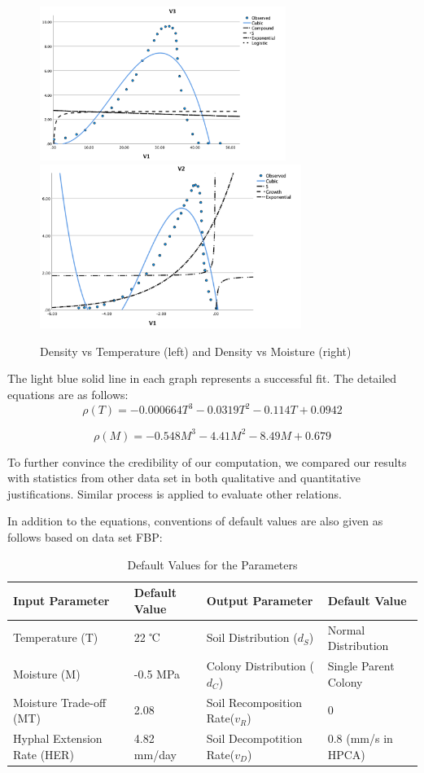 \documentclass[12pt]{article}
\begin{document}
\begin{figure}[!htbp]
	\small
	\centering
	\includegraphics[width=8cm]{./pictures/temp1.png}
	\includegraphics[width=8.5cm]{./pictures/moisture1.png}
	\caption{Density vs Temperature (left) and Density vs Moisture (right)}\label{nt}
\end{figure}
The light blue solid line in each graph represents a successful fit. The detailed equations are as follows:
\begin{equation}
	\rho (T)=-0.000664T^3-0.0319T^2-0.114T+0.0942
\end{equation}

\begin{equation}
	\rho (M)=-0.548M^3-4.41M^2-8.49M+0.679
\end{equation}

To further convince the credibility of our computation, we compared our results with statistics from other data set in both qualitative and quantitative justifications. Similar process is applied to evaluate other relations. 

In addition to the equations, conventions of default values are also given as follows based on data set FBP:
\begin{table}[H]
	\caption{Default Values for the Parameters}
	\label{tab:my-table}
	\centering
	\begin{tabular}{llll}
		\hline
		Input Parameter & Default Value & Output Parameter & Default Value \\ \hline
		Temperature (T) & 22 ℃  & Soil Distribution ($d_S$)  &  Normal Distribution             \\
		Moisture (M)  & -0.5 MPa & Colony Distribution ($d_C$) &  Single Parent Colony \\
		Moisture Trade-off (MT)& 2.08 & Soil Recomposition Rate($v_R$)  & 0   \\
		Hyphal Extension Rate (HER)& 4.82 mm/day & Soil Decompotition Rate($v_D$) & 0.8 (mm/s in HPCA)\\ 
		\cline{1-4}
	\end{tabular}
\end{table}
\end{document}
